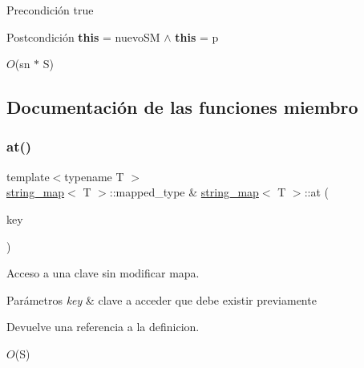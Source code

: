 \begin{DoxyPrecond}{Precondición}
true 
\end{DoxyPrecond}
\begin{DoxyPostcond}{Postcondición}
{\bfseries this} = nuevo\+SM $\land$ {\bfseries this} = p 
\begin{DoxyDescription}
\item[Complejidad Temporal]$O$(sn $\ast$ S)
\end{DoxyDescription}
\end{DoxyPostcond}


\subsection{Documentación de las funciones miembro}
\mbox{\label{classstring__map_afcc707f585755be24ffc4b06149f1cec}} 
\subsubsection{\texorpdfstring{at()}{at()}\hspace{0.1cm}{\footnotesize\ttfamily [1/2]}}
{\footnotesize\ttfamily template$<$typename T $>$ \\
\mbox{\hyperlink{classstring__map}{string\+\_\+map}}$<$ T $>$\+::mapped\+\_\+type \& \mbox{\hyperlink{classstring__map}{string\+\_\+map}}$<$ T $>$\+::at (\begin{DoxyParamCaption}\item[{const key\+\_\+type \&}]{key }\end{DoxyParamCaption})}



Acceso a una clave sin modificar mapa. 


\begin{DoxyParams}{Parámetros}
{\em key} & clave a acceder que debe existir previamente \\
\hline
\end{DoxyParams}
\begin{DoxyReturn}{Devuelve}
una referencia a la definicion.
\end{DoxyReturn}

\begin{DoxyDescription}
\item[Complejidad Temporal]$O$(S)
\end{DoxyDescription}\mbox{\label{classstring__map_aa57a57621a1bd76ce603bc9b22606458}} 
